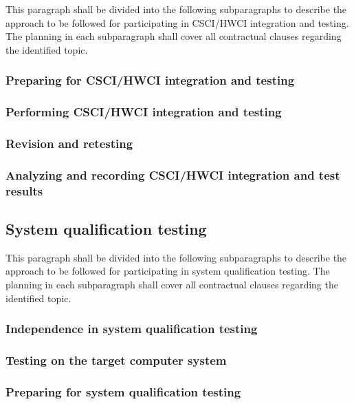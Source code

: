 This paragraph shall be divided into the following subparagraphs to
describe the approach to be followed for participating in CSCI/HWCI
integration and testing. The planning in each subparagraph shall cover
all contractual clauses regarding the identified topic.

\subsubsection{Preparing for CSCI/HWCI integration and testing}

\subsubsection{Performing CSCI/HWCI integration and testing}

\subsubsection{Revision and retesting}

\subsubsection{Analyzing and recording CSCI/HWCI integration and test
results}

\subsection{System qualification testing}

This paragraph shall be divided into the following subparagraphs to
describe the approach to be followed for participating in system
qualification testing. The planning in each subparagraph shall cover all
contractual clauses regarding the identified topic.

\subsubsection{Independence in system qualification testing}

\subsubsection{Testing on the target computer system}

\subsubsection{Preparing for system qualification testing}

